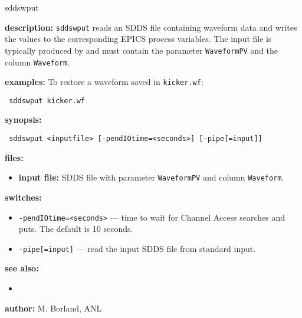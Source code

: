 \begin{sddsprog}{sddswput}
\item \textbf{description:}
  \verb+sddswput+ reads an SDDS file containing waveform data and writes the
  values to the corresponding EPICS process variables.  The input file is
  typically produced by  and must contain the parameter
  \verb|WaveformPV| and the column \verb|Waveform|.

\item \textbf{examples:}
  To restore a waveform saved in \verb|kicker.wf|:
  \begin{flushleft}{\tt
  sddswput kicker.wf
  }\end{flushleft}

\item \textbf{synopsis:}
  \begin{flushleft}{\tt
  sddswput <inputfile>\
      [-pendIOtime=<seconds>] [-pipe[=input]]
  }\end{flushleft}

\item \textbf{files:}
\begin{itemize}
  \item \textbf{input file:} SDDS file with parameter \verb|WaveformPV| and column \verb|Waveform|.
\end{itemize}

\item \textbf{switches:}
\begin{itemize}
  \item {\tt -pendIOtime=<seconds>} --- time to wait for Channel Access searches and puts. The default is 10 seconds.
  \item {\tt -pipe[=input]} --- read the input SDDS file from standard input.
\end{itemize}

\item \textbf{see also:}
\begin{itemize}
  \item {}
\end{itemize}

\item \textbf{author:} M. Borland, ANL
\end{sddsprog}
